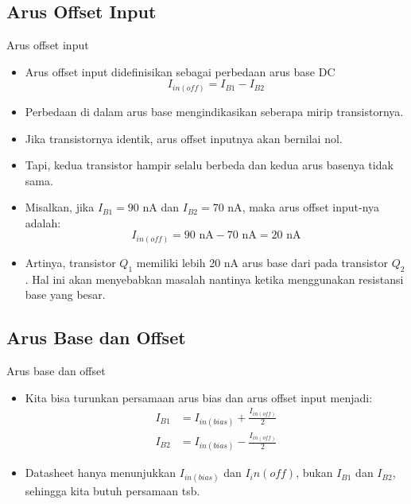 \documentclass[aspectratio=169]{beamer}
\begin{document}
\subsection{Arus Offset Input}
\begin{frame}{Arus offset input}
	\begin{itemize}
		\item Arus offset input didefinisikan sebagai perbedaan arus base DC
		\begin{equation}
			I_{in(off)} = I_{B1} - I_{B2}
		\end{equation}
		\item Perbedaan di dalam arus base mengindikasikan seberapa mirip transistornya.
		\item Jika transistornya identik, arus offset inputnya akan bernilai nol.
		\item Tapi, kedua transistor hampir selalu berbeda dan kedua arus basenya tidak sama.
		\item Misalkan, jika $ I_{B1} = 90 \text{ nA} $ dan $ I_{B2} = 70 \text{ nA} $, maka arus offset input-nya adalah:
		\[ I_{in(off)} = 90 \text{ nA} - 70 \text{ nA} = 20 \text{ nA}\]
		\item Artinya, transistor $ Q_1 $ memiliki lebih 20 nA arus base dari pada transistor $ Q_2 $. Hal ini akan menyebabkan masalah nantinya ketika menggunakan resistansi base yang besar.
	\end{itemize}
\end{frame}

\subsection{Arus Base dan Offset}
\begin{frame}{Arus base dan offset}
	\begin{itemize}
		\item Kita bisa turunkan persamaan arus bias dan arus offset input menjadi:
		\begin{align*}
			I_{B1} &= I_{in(bias)} + \frac{I_{in(off)}}{2} \\
			I_{B2} &= I_{in(bias)} - \frac{I_{in(off)}}{2}
		\end{align*}
		\item Datasheet hanya menunjukkan $ I_{in(bias)} $ dan $ I_in(off) $, bukan $ I_{B1} $ dan $ I_{B2} $, sehingga kita butuh persamaan tsb.
	\end{itemize}
\end{frame}
\end{document}
